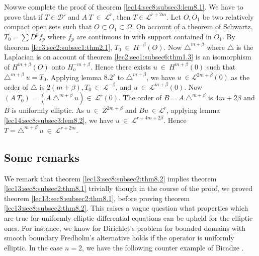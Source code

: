 Now\pageoriginale we complete the proof of theorem \ref{lec14:sec8:subsec3:lem8.1}. We have to prove that if
$T \in \mathscr{D}'$  and $A ~ T ~ \in
~\mathscr{L}^r$, then $T \in \mathscr{L}^{r+2m}$. Let $O, O_1$ be
two relatively compact open sets such that $O \subset O_1 \subset \Omega$. On
account of a theorem of Schwartz, $T_0 = \sum D^p f_p$ where $f_p$ are
continuous in with support contained in $O_1$. By theorem \ref{lec3:sec2:subsec1:thm2.1}, $T_0
~ \in ~ H^{-\beta}(O)$. Now $\triangle^{m+\beta}$ where
$\triangle$ is the Laplacian is on account of theorem \ref{lec2:sec1:subsec6:thm1.3} is an
isomorphism of $H^{m+\beta}(O)$ onto $H^{-m+\beta}_o$. Hence there
exists $u ~ \in ~ H^{m+\beta}(0)$ such that
$\triangle^{m+\beta} ~ u = T_0$. Applying lemma $8.2'$ to
$\triangle^{m+\beta}$, we have $u ~ \in
\mathscr{L}^{2m+\beta}(0)$ as the order of $\triangle$ is
$2(m+\beta),T_0 ~ \in ~ \mathscr{L}^{-\beta}$, and $u ~
\in ~ \mathscr{L}^{m+\beta}(0)$. Now $(A ~ T_0) = (A ~
\triangle^{m+\beta} ~ u) \in ~ \mathscr{L}^r(0)$. The order of
$B = A ~ \triangle^{m+\beta}$ is $4m+2\beta$ and $B$ is uniformly
elliptic. As $u ~ \in ~ Z^{2m+\beta}$ and $Bu ~ \in
\mathscr{L}^r$, applying lemma \ref{lec14:sec8:subsec3:lem8.2}, we have $u ~ \in ~
\mathscr{L}^{r+4m+2\beta}$. Hence $T = \triangle^{m+\beta} ~ u ~
\in ~ \mathscr{L}^{r+2m}$. 

\subsection{Some remarks}\label{lec14:sec8:subsec4} %

We remark that theorem \ref{lec13:sec8:subsec2:thm8.2} implies theorem \ref{lec13:sec8:subsec2:thm8.1} trivially though in
the course of the proof, we proved theorem \ref{lec13:sec8:subsec2:thm8.1}, before proving
theorem \ref{lec13:sec8:subsec2:thm8.2}. This raises a vague question what properties which are
true for uniformly elliptic differential equations can be upheld for
the elliptic ones. For instance, we know for Dirichlet's problem for
bounded domains with smooth boundary Fredholm's alternative holds if
the operator is uniformly elliptic. In the case $n = 2$, we have the
following counter example of Bicadze \cite{k4}. 

